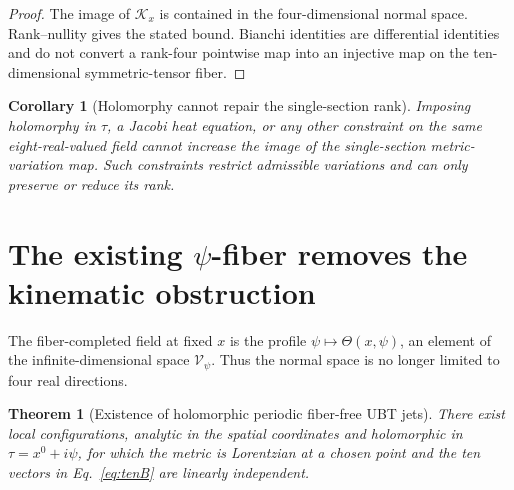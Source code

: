 \documentclass[11pt,a4paper]{article}
\newtheorem{theorem}[definition]{Theorem}
\newtheorem{corollary}[definition]{Corollary}
\theoremstyle{remark}
\begin{document}
\begin{proof}
The image of $\mathcal K_x$ is contained in the four-dimensional normal space.
Rank--nullity gives the stated bound.  Bianchi identities are differential
identities and do not convert a rank-four pointwise map into an injective map on
the ten-dimensional symmetric-tensor fiber.
\end{proof}

\begin{corollary}[Holomorphy cannot repair the single-section rank]
Imposing holomorphy in $\tau$, a Jacobi heat equation, or any other constraint
on the same eight-real-valued field cannot increase the image of the
single-section metric-variation map.  Such constraints restrict admissible
variations and can only preserve or reduce its rank.
\end{corollary}

\section{The existing $\psi$-fiber removes the kinematic obstruction}

The fiber-completed field at fixed $x$ is the profile
$\psi\mapsto\Theta(x,\psi)$, an element of the infinite-dimensional space
$\mathscr V_\psi$.  Thus the normal space is no longer limited to four
real directions.

\begin{theorem}[Existence of holomorphic periodic fiber-free UBT jets]
There exist local configurations, analytic in the spatial coordinates and
holomorphic in $\tau=x^0+i\psi$, for which the metric is Lorentzian at a
chosen point and the ten vectors in Eq.~\eqref{eq:tenB} are linearly
independent.
\end{theorem}
\end{document}
